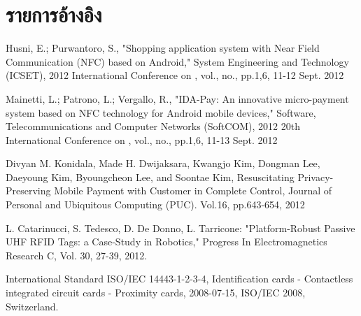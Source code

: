 \documentclass[a4paper]{article}
\begin{document}
\section{รายการอ้างอิง}
\begin{enumerate}[label={[\arabic*]}]
  	\item \label{itm:shopping} Husni, E.; Purwantoro, S., "Shopping application system with Near Field Communication (NFC) based on Android," System Engineering and Technology (ICSET), 2012 International Conference on , vol., no., pp.1,6, 11-12 Sept. 2012
  	\item \label{itm:IDA-Pay} Mainetti, L.; Patrono, L.; Vergallo, R., "IDA-Pay: An innovative micro-payment system based on NFC technology for Android mobile devices," Software, Telecommunications and Computer Networks (SoftCOM), 2012 20th International Conference on , vol., no., pp.1,6, 11-13 Sept. 2012
	\item \label{itm:rpp-mobile} Divyan M. Konidala, Made H. Dwijaksara, Kwangjo Kim, Dongman Lee, Daeyoung Kim, Byoungcheon Lee, and Soontae Kim, Resuscitating Privacy-Preserving Mobile Payment with Customer in Complete Control, Journal of Personal and Ubiquitous Computing (PUC). Vol.16, pp.643-654, 2012
	\item \label{itm:prp-rfid} L. Catarinucci, S. Tedesco, D. De Donno, L. Tarricone: "Platform-Robust Passive UHF RFID Tags: a Case-Study in Robotics," Progress In Electromagnetics Research C, Vol. 30, 27-39, 2012.
	\item \label{itm:cicc} International Standard ISO/IEC 14443-1-2-3-4, Identification cards - Contactless integrated circuit cards - Proximity cards, 2008-07-15, ISO/IEC 2008, Switzerland.
\end{enumerate}
\end{document}
